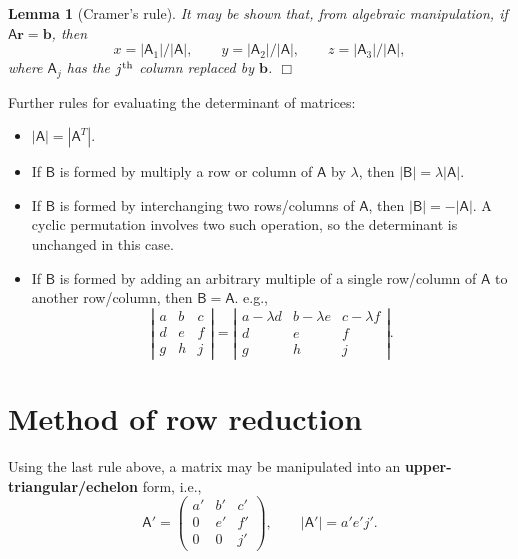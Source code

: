\documentclass[letter-paper]{tufte-book}
\newtheorem{lemma}[theorem]{\color{pastel-blue}Lemma}
\newcommand{\bb}{\boldsymbol{b}}
\newcommand\Def[1]{\textbf{#1}}
\newcommand{\qedwhite}{\hfill \ensuremath{\Box}}
\begin{document}
\begin{lemma}[Cramer's rule]
	It may be shown that, from algebraic manipulation, if
	$\mathsf{A}\boldsymbol{r}=\bb$, then
	\begin{equation*}
		x=|\mathsf{A}_{1}|/|\mathsf{A}|,\qquad
		y=|\mathsf{A}_{2}|/|\mathsf{A}|,\qquad
		z=|\mathsf{A}_{3}|/|\mathsf{A}|,
	\end{equation*}
	where $\mathsf{A}_{j}$ has the $j^{\textnormal{th}}$ column replaced by
	$\bb$. \qedwhite
\end{lemma}

Further rules for evaluating the determinant of matrices:
\begin{itemize}
	\item $|\mathsf{A}|=|\mathsf{A}^{T}|$.
	\item If $\mathsf{B}$ is formed by multiply a row or column of $\mathsf{A}$
	by $\lambda$, then $|\mathsf{B}|=\lambda|\mathsf{A}|$.
	\item If $\mathsf{B}$ is formed by interchanging two rows/columns of
	$\mathsf{A}$, then $|\mathsf{B}|=-|\mathsf{A}|$. A cyclic permutation
	involves two such operation, so the determinant is unchanged in this case.
	\item If $\mathsf{B}$ is formed by adding an arbitrary multiple of a single
	row/column of $\mathsf{A}$ to another row/column, then
	$\mathsf{B}=\mathsf{A}$. e.g.,
	\begin{equation*}
		\left|\begin{matrix}a & b & c\\ d & e & f\\ g & h & j\end{matrix}\right|
		=\left|\begin{matrix}a-\lambda d & b-\lambda e & c-\lambda f
		\\ d & e & f\\ g & h & j\end{matrix}\right|.
	\end{equation*}
\end{itemize}


\section{Method of row reduction}

Using the last rule above, a matrix may be manipulated into an
\Def{upper-triangular/echelon} form, i.e.,
\begin{equation*}
	\mathsf{A}'=\begin{pmatrix}a' & b' & c'\\ 0 & e' & f'\\
	0 & 0 & j'\end{pmatrix},\qquad |\mathsf{A}'|=a'e'j'.
\end{equation*}
\end{document}
